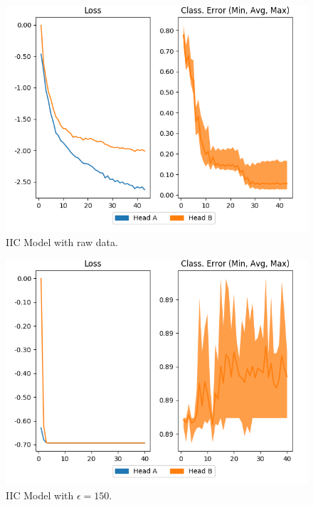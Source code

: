 \documentclass[12pt]{report}
\begin{document}
\begin{figure}[H]
  \centering
  \begin{minipage}{0.45\textwidth}
    \includegraphics[width=\textwidth]{figures/normal.png}
    \centering
    IIC Model with raw data.
  \end{minipage}%
  \hspace{0.09\textwidth}
  \begin{minipage}{0.45\textwidth}
    \includegraphics[width=\textwidth]{figures/epsilon-150.png}
    \centering
    IIC Model with $\epsilon=150$.
  \end{minipage}%
  \\[2em]
    \begin{minipage}{0.45\textwidth}

\end{minipage}
\end{figure}
\end{document}

